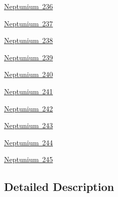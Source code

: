 \begin{DoxyCompactItemize}
\item 
\mbox{\hyperlink{group___isotope_const-_neptunium-_np236}{Neptunium 236}}
\item 
\mbox{\hyperlink{group___isotope_const-_neptunium-_np237}{Neptunium 237}}
\item 
\mbox{\hyperlink{group___isotope_const-_neptunium-_np238}{Neptunium 238}}
\item 
\mbox{\hyperlink{group___isotope_const-_neptunium-_np239}{Neptunium 239}}
\item 
\mbox{\hyperlink{group___isotope_const-_neptunium-_np240}{Neptunium 240}}
\item 
\mbox{\hyperlink{group___isotope_const-_neptunium-_np241}{Neptunium 241}}
\item 
\mbox{\hyperlink{group___isotope_const-_neptunium-_np242}{Neptunium 242}}
\item 
\mbox{\hyperlink{group___isotope_const-_neptunium-_np243}{Neptunium 243}}
\item 
\mbox{\hyperlink{group___isotope_const-_neptunium-_np244}{Neptunium 244}}
\item 
\mbox{\hyperlink{group___isotope_const-_neptunium-_np245}{Neptunium 245}}
\end{DoxyCompactItemize}


\subsection{Detailed Description}
